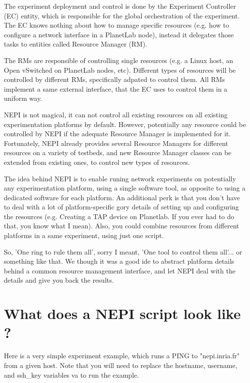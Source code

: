 The experiment deployment and control is done by the
Experiment Controller (EC) entity, which is responsible for the 
global orchestration of the experiment. 
The EC knows nothing about how to manage specific resources 
(e.g. how to configure a network interface in a PlanetLab node),
instead it delegates those tasks to entities called Resource Manager (RM).

The RMs are responsible of controlling single resources 
(e.g. a Linux host, an Open vSwitched on PlanetLab 
nodes, etc). Different types of resources will be controlled by
different RMs, specifically adpated to control them.
All RMs implement a same external interface, that the EC uses 
to control them in a uniform way.

NEPI is not magical, it can not control all existing resources
on all existing experimentation platforms by default.
However, potentially any resource could be controlled by 
NEPI if the adequate Resource Manager is implemented for it.
Fortunately, NEPI already provides several Resource Managers for
different resources on a variety of testbeds, and new 
Resource Manager classes can be extended from existing ones,
to control new types of resources. 

The idea behind NEPI is to enable runing network experiments on 
potentially any experimentation platform, using a single
software tool, as opposite to using a dedicated software for 
each platform. An additional perk is that you don't have to deal 
with a lot of platform-specific gory details of setting up and 
configuring the resources (e.g. Creating a TAP device on Planetlab.
If you ever had to do that, you know what I mean). Also, 
you could combine resources from different platforms in a same
experiment, using just one script.

So, 'One ring to rule them all', sorry I meant, 'One tool to 
control them all'... or something like that.
We though it was a good ide to abstract platform details
behind a common resource management interface, and let 
NEPI deal with the details and give you back the results.

\section{What does a NEPI script look like ?}
\label{faq:ping_example}

Here is a very simple experiment example, which runs a PING
to "nepi.inria.fr" from a given host.
Note that you will need to replace the hostname, username, and
ssh\_key variables va to run the example. 

